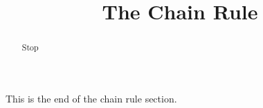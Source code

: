 \documentclass[handout]{ximera}
\title{The Chain Rule}
\begin{document}
\begin{abstract} Stop
\end{abstract}

\maketitle

This is the end of the chain rule section.
\end{document}
